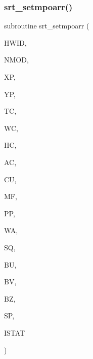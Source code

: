 \subsubsection{\texorpdfstring{srt\+\_\+setmpoarr()}{srt\_setmpoarr()}}
{\footnotesize\ttfamily subroutine srt\+\_\+setmpoarr (\begin{DoxyParamCaption}\item[{double precision}]{H\+W\+ID,  }\item[{integer}]{N\+M\+OD,  }\item[{double precision, dimension(nmod)}]{XP,  }\item[{double precision, dimension(nmod)}]{YP,  }\item[{double precision, dimension(nmod)}]{TC,  }\item[{double precision, dimension(nmod)}]{WC,  }\item[{double precision, dimension(nmod)}]{HC,  }\item[{double precision, dimension(nmod)}]{AC,  }\item[{double precision, dimension(nmod)}]{CU,  }\item[{double precision, dimension(nmod)}]{MF,  }\item[{double precision, dimension(nmod)}]{PP,  }\item[{double precision, dimension(nmod)}]{WA,  }\item[{double precision, dimension(nmod)}]{SQ,  }\item[{double precision, dimension(nmod)}]{BU,  }\item[{double precision, dimension(nmod)}]{BV,  }\item[{double precision, dimension(nmod)}]{BZ,  }\item[{double precision, dimension(nmod)}]{SP,  }\item[{integer}]{I\+S\+T\+AT }\end{DoxyParamCaption})}

